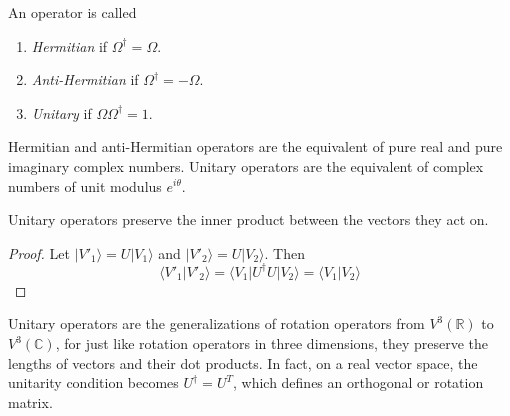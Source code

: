 \documentclass[11pt,fleqn]{book} %
\newcommand{\bra}[1]{\langle #1|}
\newcommand{\ket}[1]{| #1\rangle}
\newcommand{\scalar}[2]{\langle #1| #2\rangle}
\begin{document}
\begin{definition}
    An operator is called 
    \begin{enumerate}
        \item \textit{Hermitian} if $\Omega^\dagger=\Omega$.
        \item \textit{Anti-Hermitian} if $\Omega^\dagger=-\Omega$.
        \item \textit{Unitary} if $\Omega\Omega^\dagger=1$.
    \end{enumerate}
\end{definition}

\begin{remark}
    Hermitian and anti-Hermitian operators are the equivalent of pure real and pure imaginary complex numbers. Unitary operators
    are the equivalent of complex numbers of unit modulus $e^{i\theta}$.
\end{remark}

\begin{theorem}
    Unitary operators preserve the inner product between the vectors they act on.
\end{theorem}
\begin{proof}
    Let $\ket{V'_1}=U\ket{V_1}$ and $\ket{V'_2}=U\ket{V_2}$. Then 
    \begin{equation*}
        \scalar{V'_1}{V'_2} = \bra{V_1}U^\dagger U\ket{V_2} = \scalar{V_1}{V_2}
    \end{equation*}
\end{proof}

\begin{remark}
    Unitary operators are the generalizations of rotation operators from $V^3(\mathbb{R})$ to $V^3(\mathbb{C})$,
    for just like rotation operators in three dimensions, they preserve the lengths of vectors and their dot products. 
    In fact, on a real vector space, the unitarity condition becomes $U^\dagger=U^T$, which defines an orthogonal or
    rotation matrix.
\end{remark}
\end{document}
